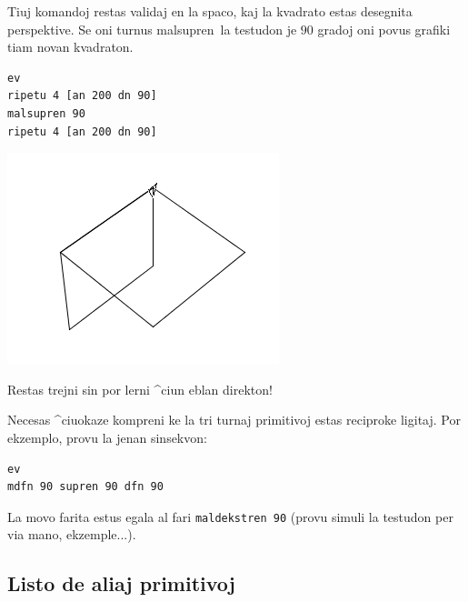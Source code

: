 Tiuj komandoj restas validaj en la spaco, kaj la kvadrato estas desegnita perspektive.
Se oni turnus \og malsupren\fg\ la testudon je $90$ gradoj oni povus grafiki tiam novan kvadraton.

\begin{minipage}{7cm}
\begin{verbatim}
ev
ripetu 4 [an 200 dn 90]
malsupren 90
ripetu 4 [an 200 dn 90]
\end{verbatim}
\end{minipage}
\begin{minipage}{10cm}
  \begin{center}
    \includegraphics*[scale=0.4]{bildoj/perspective1.png}
  \end{center}
\end{minipage}

Restas trejni sin por lerni ^ciun eblan direkton!

Necesas ^ciuokaze kompreni ke la tri turnaj primitivoj estas reciproke ligitaj.
Por ekzemplo, provu la jenan sinsekvon:

\begin{minipage}{7cm}
\begin{verbatim}
ev
mdfn 90 supren 90 dfn 90
\end{verbatim}
\end{minipage}
\hspace{3cm}
\begin{minipage}{7cm}
  \begin{center}
    La movo farita estus egala al fari \texttt{maldekstren 90} 
    (provu simuli la testudon per via mano, ekzemple...).
  \end{center}
\end{minipage}

\subsection{Listo de aliaj primitivoj}

